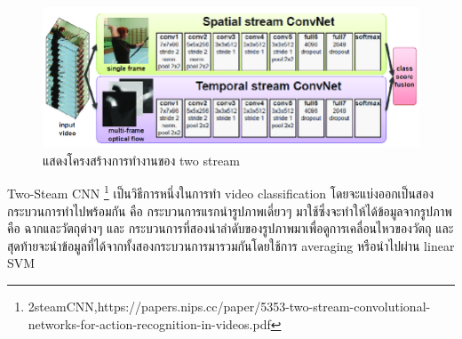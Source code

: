 \begin{figure}[!ht]
	\centering
	\includegraphics[width=1\textwidth]{chapter2/images/2steamCNN.png}
		\caption{แสดงโครงสร้างการทำงานของ two stream}
    	\label{fig:/2steamCNN}
\end{figure}

Two-Steam CNN \footnote{2steamCNN,https://papers.nips.cc/paper/5353-two-stream-convolutional-networks-for-action-recognition-in-videos.pdf} 
เป็นวิธีการหนึ่งในการทำ video classification โดยจะแบ่งออกเป็นสองกระบวนการทำไปพร้อมกัน คือ 
กระบวนการแรกนำรูปภาพเดี่ยวๆ มาใช้ซึ่งจะทำให้ได้ข้อมูลจากรูปภาพคือ ฉากและวัตถุต่างๆ และ 
กระบวนการที่สองนำลำดับของรูปภาพมาเพื่อดูการเคลื่อนไหวของวัตถุ 
และสุดท้ายจะนำข้อมูลที่ได้จากทั้งสองกระบวนการมารวมกันโดยใช้การ 
averaging หรือนำไปผ่าน linear SVM 
